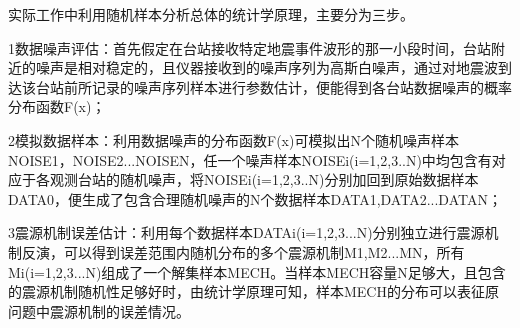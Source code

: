 实际工作中利用随机样本分析总体的统计学原理，主要分为三步。

1数据噪声评估：首先假定在台站接收特定地震事件波形的那一小段时间，台站附近的噪声是相对稳定的，且仪器接收到的噪声序列为高斯白噪声，通过对地震波到达该台站前所记录的噪声序列样本进行参数估计，便能得到各台站数据噪声的概率分布函数F(x)；

2模拟数据样本：利用数据噪声的分布函数F(x)可模拟出N个随机噪声样本NOISE1，NOISE2...NOISEN，任一个噪声样本NOISEi(i=1,2,3..N)中均包含有对应于各观测台站的随机噪声，将NOISEi(i=1,2,3..N)分别加回到原始数据样本DATA0，便生成了包含合理随机噪声的N个数据样本DATA1,DATA2...DATAN；

3震源机制误差估计：利用每个数据样本DATAi(i=1,2,3...N)分别独立进行震源机制反演，可以得到误差范围内随机分布的多个震源机制M1,M2...MN，所有Mi(i=1,2,3...N)组成了一个解集样本MECH。当样本MECH容量N足够大，且包含的震源机制随机性足够好时，由统计学原理可知，样本MECH的分布可以表征原问题中震源机制的误差情况。
